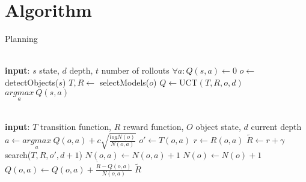 \section{Algorithm}

\begin{algorithm}
\caption{Planning}\label{alg:planning}
\begin{algorithmic}
 \\
   \textbf{input}: $s$ state, $d$ depth, $t$ number of rollouts
   \State $\forall a: Q(s,a) \gets 0$ 
   \State $o \gets$ detectObjects($s$) 
   \State $T, R \gets$ selectModels($o$)
        \State $Q \gets $UCT$(T, R, o, d)$
    \EndFor
   \State \Return $\underset{a}{argmax}\ Q(s,a)$
\EndProcedure

 \\
   \textbf{input}: $T$ transition function, $R$ reward function, $O$ object state, $d$ current depth
     \EndIf
   $a \gets \underset{a}{argmax}\ Q(o,a) + c \sqrt{\frac{log N(o)}{N(o,a)}}$
   \State $o' \gets T(o, a)$
   \State $r \gets R(o, a)$
   \State $\tilde{R} \gets r + \gamma$ search($T,R,o',d+1$)
   \State $N(o,a) \gets N(o,a) + 1$
   \State $N(o) \gets N(o) + 1$
   \State $Q(o,a) \gets Q(o,a) + \frac{\tilde{R}-Q(o,a)}{N(o,a)}$
   \State \Return $\tilde{R}$
\EndProcedure

\end{algorithmic}
\end{algorithm}